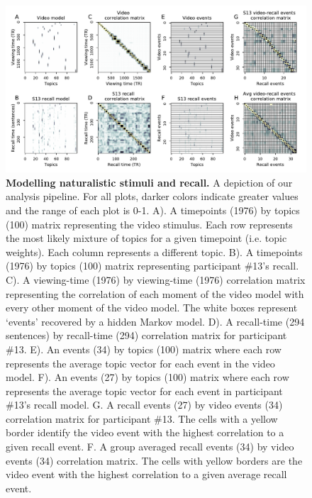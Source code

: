 \documentclass{article}
\begin{document}
{\begin{figure}[ht!]
\centering
\includegraphics[width=\textwidth]{figs/2_eventseg.pdf}
\caption{\small \textbf{Modelling naturalistic stimuli and recall.} A depiction of our analysis pipeline. For all plots, darker colors indicate greater values and the range of each plot is 0-1.  A). A timepoints (1976) by topics (100) matrix representing the video stimulus.  Each row represents the most likely mixture of topics for a given timepoint (i.e. topic weights). Each column represents a different topic. B). A timepoints (1976) by topics (100) matrix representing participant \#13's recall. C). A viewing-time (1976) by viewing-time (1976) correlation matrix representing the correlation of each moment of the video model with every other moment of the video model. The white boxes represent `events' recovered by a hidden Markov model. D). A recall-time (294 sentences) by recall-time (294) correlation matrix for participant \#13. E). An events (34) by topics (100) matrix where each row represents the average topic vector for each event in the video model.  F). An events (27) by topics (100) matrix where each row represents the average topic vector for each event in participant \#13's recall model. G. A recall events (27) by video events (34) correlation matrix for participant \#13. The cells with a yellow border identify the video event with the highest correlation to a given recall event. F. A group averaged recall events (34) by video events (34) correlation matrix.  The cells with yellow borders are the video event with the highest correlation to a given average recall event.}
\label{fig:model}
\end{figure}

}
\end{document}
